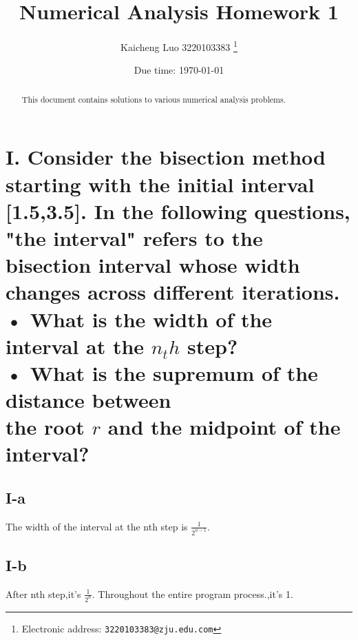 \documentclass[a4paper]{article}
\begin{document}
\title{Numerical Analysis Homework 1}

\author{Kaicheng Luo 3220103383
  \thanks{Electronic address: \texttt{3220103383@zju.edu.com}}}

\date{Due time: \today}

\maketitle

\begin{abstract}
    This document contains solutions to various numerical analysis problems.
\end{abstract}

\section*{I. Consider the bisection method starting with the initial interval [1.5,3.5]. In the following questions, "the interval" refers to the bisection interval whose width changes across different iterations.\\
 • What is the width of the interval at the \(n_th\) step?\\
 • What is the supremum of the distance between\\
 the root \( r \) and the midpoint of the interval?}

\subsection*{I-a}
The width of the interval at the nth step is \( \frac{1}{2^{n-1}} \).

\subsection*{I-b}
After nth step,it's \(\frac{1}{2^n}\).
Throughout the entire program process.,it's 1.
 
\end{document}
